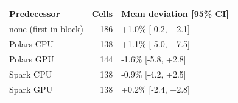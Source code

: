 \begin{tabular}{lrl}
\toprule
Predecessor & Cells & Mean deviation [95\% CI] \\
\midrule
none (first in block) & 186 & +1.0\% [-0.2, +2.1] \\
Polars CPU & 138 & +1.1\% [-5.0, +7.5] \\
Polars GPU & 144 & -1.6\% [-5.8, +2.8] \\
Spark CPU & 138 & -0.9\% [-4.2, +2.5] \\
Spark GPU & 138 & +0.2\% [-2.4, +2.8] \\
\bottomrule
\end{tabular}
